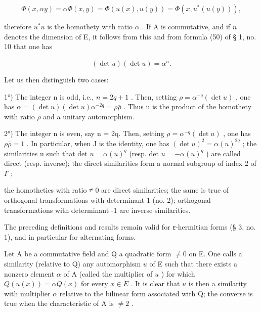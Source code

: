 \[
\Phi (x, \alpha y) = \alpha \Phi (x, y) = \Phi (u (x), u (y)) = \Phi (x, u ^ {*} (u (y))),
\]

therefore \(u^*u\) is the homothety with ratio \(\alpha\) . If A is commutative, and if \(n\) denotes the dimension of E, it follows from this and from formula (50) of § 1, no. 10 that one has

\[
(\det u) \overline {{(\det u)}} = \alpha^ {n}.\tag{8}
\]

Let us then distinguish two cases:

1°) The integer n is odd, i.e., \(n = 2q + 1\) . Then, setting \(\rho = \alpha^{-q}(\det u)\) , one has \(\alpha = (\det u) \overline{(\det u)} \alpha^{-2q} = \rho \bar{\rho}\) . Thus u is the product of the homothety with ratio \(\rho\) and a unitary automorphism.

2°) The integer n is even, say n = 2q. Then, setting \(\rho = \alpha^{-q}(\det u)\) , one has \(\rho\bar{\rho} = 1\) . In particular, when J is the identity, one has \((\det u)^{2} = \alpha(u)^{2q}\) ; the similarities u such that det \(u = \alpha(u)^{q}\) (resp. det \(u = -\alpha(u)^{q}\) ) are called direct (resp. inverse); the direct similarities form a normal subgroup of index 2 of \(\Gamma\) ;

the homotheties with ratio ≠ 0 are direct similarities; the same is true of orthogonal transformations with determinant 1 (no. 2); orthogonal transformations with determinant -1 are inverse similarities.

The preceding definitions and results remain valid for ε-hermitian forms (§ 3, no. 1), and in particular for alternating forms.

Let A be a commutative field and Q a quadratic form \(\neq 0\) on E. One calls a similarity (relative to Q) any automorphism \(u\) of E such that there exists a nonzero element \(\alpha\) of A (called the multiplier of \(u\) ) for which \(Q(u(x)) = \alpha Q(x)\) for every \(x \in E\) . It is clear that \(u\) is then a similarity with multiplier \(\alpha\) relative to the bilinear form associated with Q; the converse is true when the characteristic of A is \(\neq 2\) .
